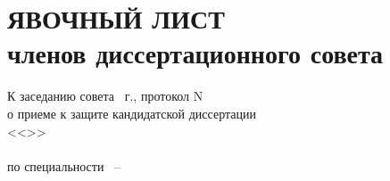 
\section{ЯВОЧНЫЙ ЛИСТ\\
	членов диссертационного совета }

\begin{center}
	К заседанию совета \underline{\hspace{2cm}}~\thesisYear г., протокол N~\underline{\hspace{2cm}} \\
	о приеме к защите кандидатской диссертации \\
	<<\thesisTitle>>\\
	\textbf{\thesisAuthorLastNameFrom}\\ 
	по специальности \thesisSpecialtyNumber\ -- \thesisSpecialtyTitle\\
\end{center}



